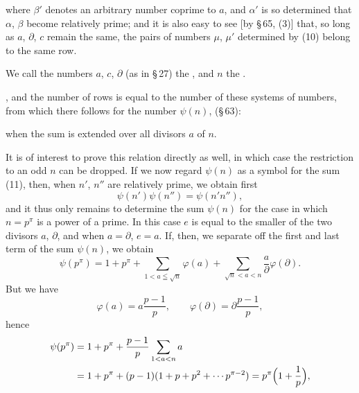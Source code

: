 
where $\beta'$ denotes an arbitrary number coprime to $a$, and $\alpha'$ is so
determined that $\alpha$, $\beta$ become relatively prime; and it is also easy
to see [by §\,65, (3)] that, so long as $a$, $\partial$, $c$ remain the same,
the pairs of numbers $\mu$, $\mu'$ determined by (10) belong to the same
row.

We call the numbers $a$, $c$, $\partial$ (as in §\,27) the , and $n$ the .

, and the number of rows is equal to the
number of these systems of numbers, from which there follows for the number
$\psi(n)$, (§\,63):


when the sum is extended over all divisors $a$ of $n$.

It is of interest to prove this relation directly as well, in which case the
restriction to an odd $n$ can be dropped. If we now regard $\psi(n)$ as a
symbol for the sum (11), then, when $n'$, $n''$ are relatively prime, we
obtain first
\[
\psi(n')\psi(n'') = \psi(n'n''),
\]
and it thus only remains to determine the sum $\psi(n)$ for the case in which
$n=p^\pi$ is a power of a prime. In this case $e$ is equal to the smaller of
the two divisors $a$, $\partial$, and when $a=\partial$, $e=a$. If, then, we
separate off the first and last term of the sum $\psi(n)$, we obtain
\[
\psi(p^\pi) = 1 + p^\pi + \sum_{1<a\leqq\sqrt{n}}\varphi(a) + \sum_{\sqrt{n}<a<n}\frac{a}{\partial}\varphi(\partial).
\]
But we have
\[
\varphi(a) = a\frac{p-1}{p}, \qquad \varphi(\partial) = \partial\frac{p-1}{p},
\]
hence
\[
\begin{aligned}
\psi(p^\pi) &= 1 + p^\pi + \frac{p-1}{p}\sum_{1<a<n} a\\
&= 1 + p^\pi + (p-1)(1+p+p^2+\cdots p^{\pi-2}) = p^\pi\Bigl(1+\frac{1}{p}\Bigr),
\end{aligned}
\]
